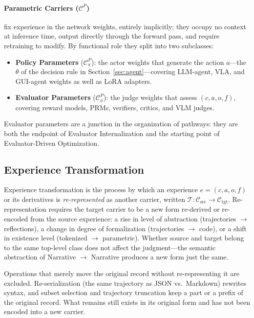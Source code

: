 \paragraph{Parametric Carriers ($\mathcal{C}^P$)} fix experience in the network weights, entirely implicitly; they occupy no context at inference time, output directly through the forward pass, and require retraining to modify. By functional role they split into two subclasses:
\begin{itemize}
  \item \textbf{Policy Parameters} ($\mathcal{C}^P_\pi$): the actor weights that generate the action $a$---the $\theta$ of the decision rule in Section~\ref{sec:agent}---covering LLM-agent, VLA, and GUI-agent weights as well as LoRA adapters.
  \item \textbf{Evaluator Parameters} ($\mathcal{C}^P_\phi$): the judge weights that assess $(c,a,o,f)$, covering reward models, PRMs, verifiers, critics, and VLM judges.
\end{itemize}
Evaluator parameters are a junction in the organization of pathways: they are both the endpoint of Evaluator Internalization and the starting point of Evaluator-Driven Optimization.

\subsection{Experience Transformation}
\label{sec:transformation}

Experience transformation is the process by which an experience $e=(c,a,o,f)$ or its derivatives is \emph{re-represented} as another carrier, written $\mathcal{T}: \mathcal{C}_{\text{src}} \rightarrow \mathcal{C}_{\text{tgt}}$. Re-representation requires the target carrier to be a new form re-derived or re-encoded from the source experience: a rise in level of abstraction (trajectories $\rightarrow$ reflections), a change in degree of formalization (trajectories $\rightarrow$ code), or a shift in existence level (tokenized $\rightarrow$ parametric). Whether source and target belong to the same top-level class does not affect the judgment---the semantic abstraction of Narrative $\rightarrow$ Narrative produces a new form just the same.

Operations that merely move the original record without re-representing it are excluded. Re-serialization (the same trajectory as JSON vs.\ Markdown) rewrites syntax, and subset selection and trajectory truncation keep a part or a prefix of the original record. What remains still exists in its original form and has not been encoded into a new carrier.

